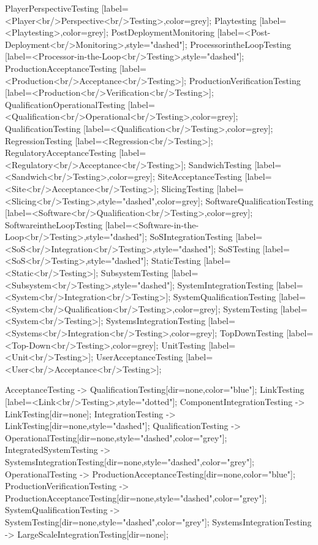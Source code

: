 \documentclass{article}
\begin{document}
{PlayerPerspectiveTesting [label=<Player<br/>Perspective<br/>Testing>,color=grey];
Playtesting [label=<Playtesting>,color=grey];
PostDeploymentMonitoring [label=<Post-Deployment<br/>Monitoring>,style="dashed"];
ProcessorintheLoopTesting [label=<Processor-in-the-Loop<br/>Testing>,style="dashed"];
ProductionAcceptanceTesting [label=<Production<br/>Acceptance<br/>Testing>];
ProductionVerificationTesting [label=<Production<br/>Verification<br/>Testing>];
QualificationOperationalTesting [label=<Qualification<br/>Operational<br/>Testing>,color=grey];
QualificationTesting [label=<Qualification<br/>Testing>,color=grey];
RegressionTesting [label=<Regression<br/>Testing>];
RegulatoryAcceptanceTesting [label=<Regulatory<br/>Acceptance<br/>Testing>];
SandwichTesting [label=<Sandwich<br/>Testing>,color=grey];
SiteAcceptanceTesting [label=<Site<br/>Acceptance<br/>Testing>];
SlicingTesting [label=<Slicing<br/>Testing>,style="dashed",color=grey];
SoftwareQualificationTesting [label=<Software<br/>Qualification<br/>Testing>,color=grey];
SoftwareintheLoopTesting [label=<Software-in-the-Loop<br/>Testing>,style="dashed"];
SoSIntegrationTesting [label=<SoS<br/>Integration<br/>Testing>,style="dashed"];
SoSTesting [label=<SoS<br/>Testing>,style="dashed"];
StaticTesting [label=<Static<br/>Testing>];
SubsystemTesting [label=<Subsystem<br/>Testing>,style="dashed"];
SystemIntegrationTesting [label=<System<br/>Integration<br/>Testing>];
SystemQualificationTesting [label=<System<br/>Qualification<br/>Testing>,color=grey];
SystemTesting [label=<System<br/>Testing>];
SystemsIntegrationTesting [label=<Systems<br/>Integration<br/>Testing>,color=grey];
TopDownTesting [label=<Top-Down<br/>Testing>,color=grey];
UnitTesting [label=<Unit<br/>Testing>];
UserAcceptanceTesting [label=<User<br/>Acceptance<br/>Testing>];

AcceptanceTesting -> QualificationTesting[dir=none,color="blue"];
LinkTesting [label=<Link<br/>Testing>,style="dotted"];
ComponentIntegrationTesting -> LinkTesting[dir=none];
IntegrationTesting -> LinkTesting[dir=none,style="dashed"];
QualificationTesting -> OperationalTesting[dir=none,style="dashed",color="grey"];
IntegratedSystemTesting -> SystemsIntegrationTesting[dir=none,style="dashed",color="grey"];
OperationalTesting -> ProductionAcceptanceTesting[dir=none,color="blue"];
ProductionVerificationTesting -> ProductionAcceptanceTesting[dir=none,style="dashed",color="grey"];
SystemQualificationTesting -> SystemTesting[dir=none,style="dashed",color="grey"];
SystemsIntegrationTesting -> LargeScaleIntegrationTesting[dir=none];

}
\end{document}
